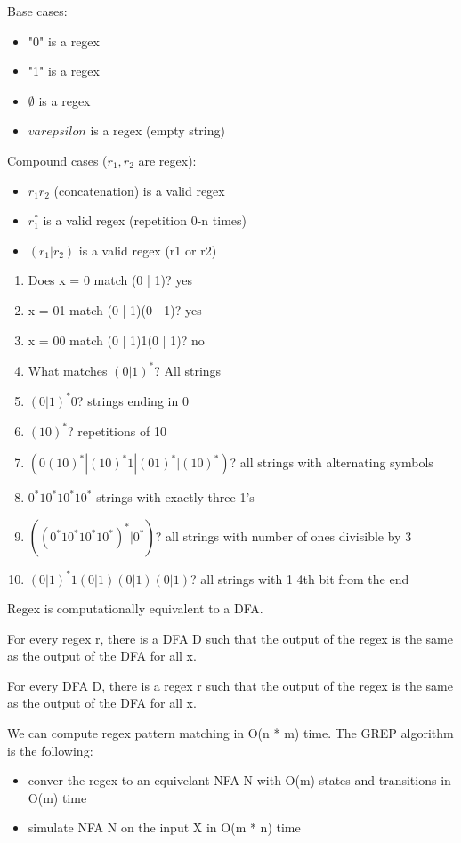 \begin{definition}
    
    Base cases:
    \begin{itemize}
        \item "0" is a regex
        \item "1" is a regex
        \item $\emptyset$ is a regex
        \item $varepsilon$ is a regex (empty string)
    \end{itemize}

    Compound cases ($r_1, r_2$ are regex):
    \begin{itemize}
        \item $r_1r_2$ (concatenation) is a valid regex
        \item $r_1^*$ is a valid regex (repetition 0-n times)
        \item $(r_1 | r_2)$ is a valid regex (r1 or r2)
    \end{itemize}
\end{definition}

\begin{example}
    \begin{enumerate}
        \item Does x = 0 match (0 | 1)? yes
        \item x = 01 match (0 | 1)(0 | 1)? yes
        \item x = 00 match (0 | 1)1(0 | 1)? no
        \item What matches $(0 | 1)^*$? All strings
        \item $(0 | 1)^*0$? strings ending in 0
        \item $(10)^*$? repetitions of 10
        \item $(0(10)^* | (10)^*1 | (01)^* | (10)^*)$? all strings with alternating symbols
        \item $0^*10^*10^*10^*$ strings with exactly three 1's
        \item $((0^*10^*10^*10^*)^* | 0^*)$? all strings with number of ones divisible by 3
        \item $(0 | 1)^* 1 (0|1)(0|1)(0|1)$? all strings with 1 4th bit from the end
    \end{enumerate}
\end{example}

\begin{theorem}
    Regex is computationally equivalent to a DFA.

    For every regex r, there is a DFA D such that the output of the regex is the same as the output of the DFA for all x. 

    For every DFA D, there is a regex r such that the output of the regex is the same as the output of the DFA for all x.
\end{theorem}

We can compute regex pattern matching in O(n * m) time. The GREP algorithm is the following:
\begin{itemize}
    \item conver the regex to an equivelant NFA N with O(m) states and transitions in O(m) time
    \item simulate NFA N on the input X in O(m * n) time
\end{itemize}
